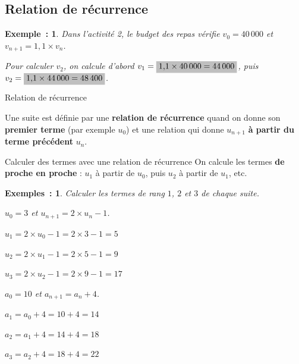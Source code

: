 \documentclass[12pt]{article}
\theoremstyle{break}
\newtheorem*{example}{Exemple~:}
\newtheorem*{examples}{Exemples~:}
\theoremstyle{inline}
\begin{document}
\subsection{Relation de récurrence}

\begin{example}
  Dans l'activité 2, le budget des repas vérifie $v_0 = 40\,000$ et $v_{n+1} = 1{,}1 \times v_n$.

  Pour calculer $v_2$, on calcule d'abord $v_1 = \hideM{1{,}1 \times 40\,000 = 44\,000}$, puis $v_2 = \hideM{1{,}1 \times 44\,000 = 48\,400}$.
\end{example}

\begin{definition}{Relation de récurrence}{}
  \begin{multihide}
    Une suite est définie par une \textbf{relation de récurrence} quand on donne son \textbf{premier terme} (par exemple $u_0$) et une relation qui donne $u_{n+1}$ \textbf{à partir du terme précédent} $u_n$.
  \end{multihide}
\end{definition}

\begin{method}{Calculer des termes avec une relation de récurrence}{}
  On calcule les termes \textbf{de proche en proche} : $u_1$ à partir de $u_0$, puis $u_2$ à partir de $u_1$, etc.
\end{method}

\begin{examples}
  Calculer les termes de rang $1$, $2$ et $3$ de chaque suite.

  \medskip
  \begin{minipage}[t]{0.48\linewidth}
    $u_0 = 3$ et $u_{n+1} = 2 \times u_n - 1$.
    \begin{multihideW}[1em]
      $u_1 = 2 \times u_0 - 1 = 2 \times 3 - 1 = 5$

      $u_2 = 2 \times u_1 - 1 = 2 \times 5 - 1 = 9$

      $u_3 = 2 \times u_2 - 1 = 2 \times 9 - 1 = 17$
    \end{multihideW}
  \end{minipage}
  \hfill
  \begin{minipage}[t]{0.48\linewidth}
    $a_0 = 10$ et $a_{n+1} = a_n + 4$.
    \begin{multihideW}[1em]
      $a_1 = a_0 + 4 = 10 + 4 = 14$

      $a_2 = a_1 + 4 = 14 + 4 = 18$

      $a_3 = a_2 + 4 = 18 + 4 = 22$
    \end{multihideW}
  \end{minipage}
\end{examples}
\end{document}
